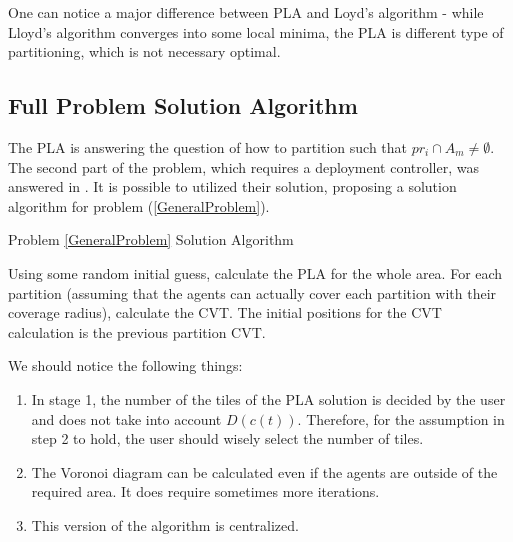 \documentclass{iacas}
\begin{document}
One can notice a major difference between PLA and Loyd's algorithm - while Lloyd's algorithm converges into some local minima, the PLA is different type of partitioning, which is not necessary optimal.


\subsection{Full Problem Solution Algorithm}
The PLA is answering the question of how to partition such that $pr_i \cap A_m \neq \emptyset$. The second part of the problem, which requires a deployment controller, was answered in \cite{Cortes2004}. It is possible to utilized their solution, proposing a solution algorithm for problem (\ref{GeneralProblem}).

\begin{algorithm}[H]
\caption{Problem \ref{GeneralProblem} Solution Algorithm}\label{GeneralProbSolution}
\begin{algorithmic}[1]
\State Using some random initial guess, calculate the PLA for the whole area.
\State For each partition (assuming that the agents can actually cover each partition with their coverage radius), calculate the CVT. The initial positions for the CVT calculation is the previous partition CVT.
\end{algorithmic}
\label{algo:problem solution algorithm}
\end{algorithm}

We should notice the following things:
\begin{enumerate}
\item In stage 1, the number of the tiles of the PLA solution is decided by the user and does not take into account $D(c(t))$. Therefore, for the assumption in step 2 to hold, the user should wisely select the number of tiles. 
\item The Voronoi diagram can be calculated even if the agents are outside of the required area. It does require sometimes more iterations.
\item This version of the algorithm is centralized.
\end{enumerate}
\end{document}
